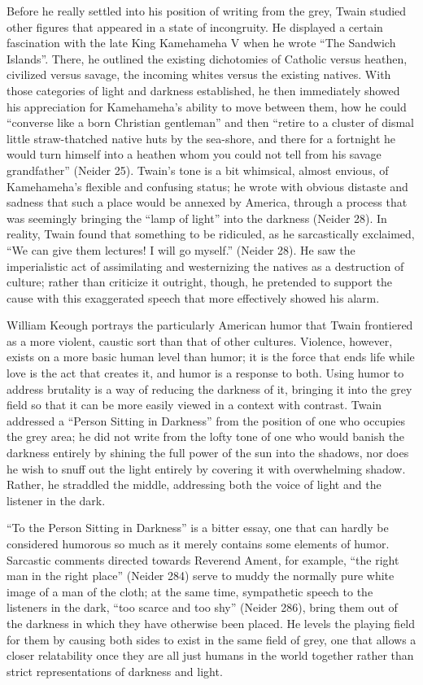 Before he really settled into his position of writing from the grey, Twain
studied other figures that appeared in a state of incongruity. He displayed a
certain fascination with the late King Kamehameha V when he wrote ``The Sandwich
Islands''. There, he outlined the existing dichotomies of Catholic versus
heathen, civilized versus savage, the incoming whites versus the existing
natives. With those categories of light and darkness established, he then
immediately showed his appreciation for Kamehameha's ability to move between
them, how he could ``converse like a born Christian gentleman'' and then
``retire to a cluster of dismal little straw-thatched native huts by the
sea-shore, and there for a fortnight he would turn himself into a heathen whom
you could not tell from his savage grandfather'' (Neider 25). Twain's tone is a
bit whimsical, almost envious, of Kamehameha's flexible and confusing status; he
wrote with obvious distaste and sadness that such a place would be annexed by
America, through a process that was seemingly bringing the ``lamp of light''
into the darkness (Neider 28). In reality, Twain found that something to be
ridiculed, as he sarcastically exclaimed, ``We can give them lectures! I will go
myself.'' (Neider 28). He saw the imperialistic act of assimilating and
westernizing the natives as a destruction of culture; rather than criticize it
outright, though, he pretended to support the cause with this exaggerated speech
that more effectively showed his alarm.

William Keough portrays the particularly American humor that Twain frontiered as
a more violent, caustic sort than that of other cultures. Violence, however,
exists on a more basic human level than humor; it is the force that ends life
while love is the act that creates it, and humor is a response to both. Using
humor to address brutality is a way of reducing the darkness of it, bringing it
into the grey field so that it can be more easily viewed in a context with
contrast. Twain addressed a ``Person Sitting in Darkness'' from the position of
one who occupies the grey area; he did not write from the lofty tone of one who
would banish the darkness entirely by shining the full power of the sun into the
shadows, nor does he wish to snuff out the light entirely by covering it with
overwhelming shadow. Rather, he straddled the middle, addressing both the voice
of light and the listener in the dark.

``To the Person Sitting in Darkness'' is a bitter essay, one that can hardly be
considered humorous so much as it merely contains some elements of humor.
Sarcastic comments directed towards Reverend Ament, for example, ``the right man
in the right place'' (Neider 284) serve to muddy the normally pure white image
of a man of the cloth; at the same time, sympathetic speech to the listeners in
the dark, ``too scarce and too shy'' (Neider 286), bring them out of the
darkness in which they have otherwise been placed. He levels the playing field
for them by causing both sides to exist in the same field of grey, one that
allows a closer relatability once they are all just humans in the world together
rather than strict representations of darkness and light.

